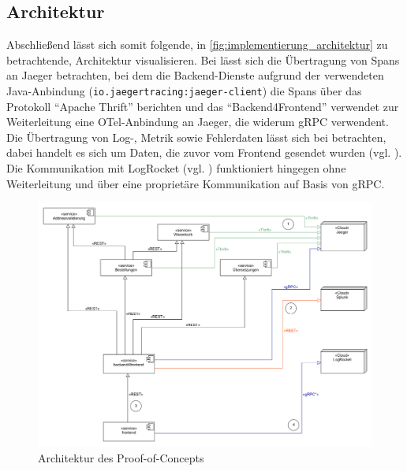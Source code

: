 



\subsection{Architektur}

Abschließend lässt sich somit folgende, in \autoref{fig:implementierung_architektur} zu betrachtende, Architektur visualisieren. Bei  lässt sich die Übertragung von Spans an Jaeger betrachten, bei dem die Backend-Dienste aufgrund der verwendeten Java-Anbindung (\texttt{io\allowbreak{}.\allowbreak{}jaegertracing\allowbreak{}:\allowbreak{}jaeger-client}) die Spans über das Protokoll \enquote{Apache Thrift} \cite{Thrift} berichten und das \enquote{Backend4Frontend} verwendet zur Weiterleitung eine OTel-Anbindung an Jaeger, die widerum gRPC verwendent. Die Übertragung von Log-, Metrik sowie Fehlerdaten lässt sich bei  betrachten, dabei handelt es sich um Daten, die zuvor vom Frontend gesendet wurden (vgl. ). Die Kommunikation mit LogRocket (vgl. ) funktioniert hingegen ohne Weiterleitung und über eine proprietäre Kommunikation auf Basis von gRPC.

\begin{figure}[H]
	\centering
	\includegraphics[width=1.00\linewidth]{img/04_erstellung-poc/implementierung.png}
	\caption{Architektur des Proof-of-Concepts}
	\label{fig:implementierung_architektur}
\end{figure}